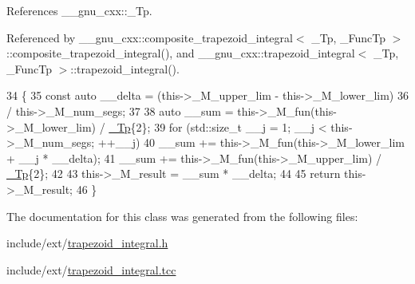 References \+\_\+\+\_\+gnu\+\_\+cxx\+::\+\_\+\+Tp.



Referenced by \+\_\+\+\_\+gnu\+\_\+cxx\+::composite\+\_\+trapezoid\+\_\+integral$<$ \+\_\+\+Tp, \+\_\+\+Func\+Tp $>$\+::composite\+\_\+trapezoid\+\_\+integral(), and \+\_\+\+\_\+gnu\+\_\+cxx\+::trapezoid\+\_\+integral$<$ \+\_\+\+Tp, \+\_\+\+Func\+Tp $>$\+::trapezoid\+\_\+integral().


\begin{DoxyCode}
34     \{
35       \textcolor{keyword}{const} \textcolor{keyword}{auto} \_\_delta = (this->\_M\_upper\_lim - this->\_M\_lower\_lim)
36                            / this->\_M\_num\_segs;
37 
38       \textcolor{keyword}{auto} \_\_sum = this->\_M\_fun(this->\_M\_lower\_lim) / \hyperlink{namespace____gnu__cxx_a3b19a9c800ca194374ef9172290f7d79}{\_Tp}\{2\};
39       \textcolor{keywordflow}{for} (std::size\_t \_\_j = 1; \_\_j < this->\_M\_num\_segs; ++\_\_j)
40         \_\_sum += this->\_M\_fun(this->\_M\_lower\_lim + \_\_j * \_\_delta);
41       \_\_sum += this->\_M\_fun(this->\_M\_upper\_lim) / \hyperlink{namespace____gnu__cxx_a3b19a9c800ca194374ef9172290f7d79}{\_Tp}\{2\};
42 
43       this->\_M\_result = \_\_sum * \_\_delta;
44 
45       \textcolor{keywordflow}{return} this->\_M\_result;
46     \}
\end{DoxyCode}


The documentation for this class was generated from the following files\+:\begin{DoxyCompactItemize}
\item 
include/ext/\hyperlink{trapezoid__integral_8h}{trapezoid\+\_\+integral.\+h}\item 
include/ext/\hyperlink{trapezoid__integral_8tcc}{trapezoid\+\_\+integral.\+tcc}\end{DoxyCompactItemize}
